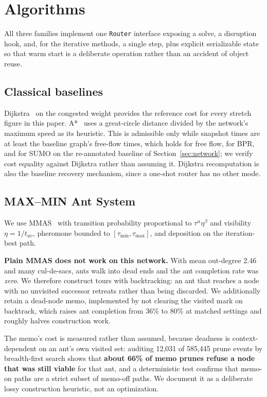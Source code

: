 \section{Algorithms}
\label{sec:algorithms}

All three families implement one \texttt{Router} interface exposing a solve,
a disruption hook, and, for the iterative methods, a single step, plus
explicit serializable state so that warm start is a deliberate operation
rather than an accident of object reuse.

\subsection{Classical baselines}

Dijkstra~\cite{dijkstra1959note} on the congested weight provides the
reference cost for every stretch figure in this paper. A*~\cite{hart1968formal}
uses a great-circle distance divided by the network's maximum speed as its
heuristic. This is admissible only while snapshot times are at least the
baseline graph's free-flow times, which holds for free flow, for BPR, and for
SUMO on the re-annotated baseline of Section~\ref{sec:network}; we verify
cost equality against Dijkstra rather than assuming it. Dijkstra recomputation
is also the baseline recovery mechanism, since a one-shot router has no other
mode.

\subsection{MAX--MIN Ant System}

We use MMAS~\cite{stutzle2000maxmin} with transition probability
proportional to $\tau^{\alpha}\eta^{\beta}$ and visibility
$\eta = 1/t_{uv}$, pheromone bounded to $[\tau_{\min},\tau_{\max}]$, and
deposition on the iteration-best path.

\textbf{Plain MMAS does not work on this network.} With mean out-degree 2.46
and many cul-de-sacs, ants walk into dead ends and the ant completion rate
was \emph{zero}. We therefore construct tours with backtracking: an ant that
reaches a node with no unvisited successor retreats rather than being
discarded. We additionally retain a dead-node memo, implemented by not
clearing the visited mark on backtrack, which raises ant completion from 36\%
to 80\% at matched settings and roughly halves construction work.

The memo's cost is measured rather than assumed, because deadness is
context-dependent on an ant's own visited set: auditing 12{,}031 of 585{,}445
prune events by breadth-first search shows that \textbf{about 66\% of memo
prunes refuse a node that was still viable} for that ant, and a deterministic
test confirms that memo-on paths are a strict subset of memo-off paths. We
document it as a deliberate lossy construction heuristic, not an
optimization.

